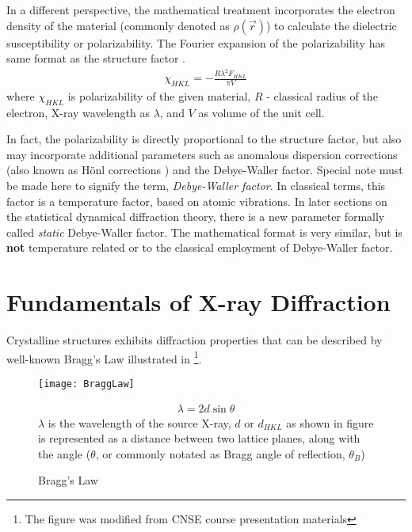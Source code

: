 In a different perspective, the mathematical treatment incorporates the electron density of the material (commonly denoted as $\rho (\vec{r})$) to calculate the dielectric susceptibility or polarizability.  The Fourier expansion of the polarizability has same format as the structure factor \cite{Authier1}.
\begin{align}
\chi_{HKL} = - \frac{R \lambda^2 F_{HKL}}{\pi V}
\end{align}
where $\chi_{HKL}$ is polarizability of the given material, $R$ - classical radius of the electron, X-ray wavelength as $\lambda$, and $V$ as volume of the unit cell.

In fact, the polarizability is directly proportional to the structure factor, but also may incorporate additional parameters such as anomalous dispersion corrections (also known as H\"onl corrections \cite{Batterman1}) and the Debye-Waller factor.  Special note must be made here to signify the term, \emph{Debye-Waller factor}.  In classical terms, this factor is a temperature factor, based on atomic vibrations.  In later sections on the statistical dynamical diffraction theory, there is a new parameter formally called \emph{static} Debye-Waller factor.  The mathematical format is very similar, but is \textbf{not} temperature related or to the classical employment of Debye-Waller factor.

	\section{Fundamentals of X-ray Diffraction}


		Crystalline structures exhibits diffraction properties that can be described by well-known Bragg's Law illustrated in  \footnote{The figure was modified from CNSE course presentation materials}.
\begin{figure}[h]
\caption{Bragg's Law}
\label{BraggLaw}
\begin{minipage}{\linewidth}
\centering
\texttt{[image: BraggLaw]}
\end{minipage}
\begin{minipage}{\linewidth}
\begin{align}
\lambda=2d \sin \theta
\end{align}
$\lambda$ is the wavelength of the source X-ray, $d$ or $d_{HKL}$ as shown in figure is represented as a distance between two lattice planes, along with the angle ($\theta$, or commonly notated as Bragg angle of reflection, $\theta_B$)
\end{minipage}
\end{figure}

